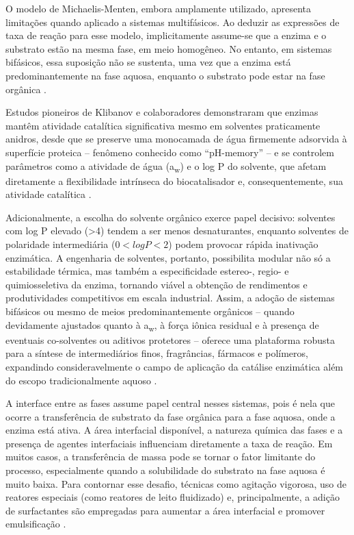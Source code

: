 \documentclass[12pt,oneside]{report}
\begin{document}
O modelo de Michaelis-Menten, embora amplamente utilizado, apresenta limitações quando aplicado a sistemas multifásicos. Ao deduzir as expressões de taxa de reação para esse modelo, implicitamente assume-se que a enzima e o substrato estão na mesma fase, em meio homogêneo. No entanto, em sistemas bifásicos, essa suposição não se sustenta, uma vez que a enzima está predominantemente na fase aquosa, enquanto o substrato pode estar na fase orgânica \cite{andersen_michaelis_2018}.

Estudos pioneiros de Klibanov \cite{klibanov} e colaboradores demonstraram que enzimas mantêm atividade catalítica significativa mesmo em solventes praticamente anidros, desde que se preserve uma monocamada de água firmemente adsorvida à superfície proteica – fenômeno conhecido como “pH-memory” – e se controlem parâmetros como a atividade de água (a\textsubscript{w}) e o log P do solvente, que afetam diretamente a flexibilidade intrínseca do biocatalisador e, consequentemente, sua atividade catalítica \cite{klibanov}.

Adicionalmente, a escolha do solvente orgânico exerce papel decisivo: solventes com log P elevado (\textgreater 4) tendem a ser menos desnaturantes, enquanto solventes de polaridade intermediária ($0 < log P < 2$) podem provocar rápida inativação enzimática. A engenharia de solventes, portanto, possibilita modular não só a estabilidade térmica, mas também a especificidade estereo-, regio- e quimiosseletiva da enzima, tornando viável a obtenção de rendimentos e produtividades competitivos em escala industrial. Assim, a adoção de sistemas bifásicos ou mesmo de meios predominantemente orgânicos – quando devidamente ajustados quanto à a\textsubscript{w}, à força iônica residual e à presença de eventuais co-solventes ou aditivos protetores – oferece uma plataforma robusta para a síntese de intermediários finos, fragrâncias, fármacos e polímeros, expandindo consideravelmente o campo de aplicação da catálise enzimática além do escopo tradicionalmente aquoso \cite{klibanov}.

A interface entre as fases assume papel central nesses sistemas, pois é nela que ocorre a transferência de substrato da fase orgânica para a fase aquosa, onde a enzima está ativa. A área interfacial disponível, a natureza química das fases e a presença de agentes interfaciais influenciam diretamente a taxa de reação. Em muitos casos, a transferência de massa pode se tornar o fator limitante do processo, especialmente quando a solubilidade do substrato na fase aquosa é muito baixa. Para contornar esse desafio, técnicas como agitação vigorosa, uso de reatores especiais (como reatores de leito fluidizado) e, principalmente, a adição de surfactantes são empregadas para aumentar a área interfacial e promover emulsificação \cite{schmid2002enzyme}.
\end{document}
